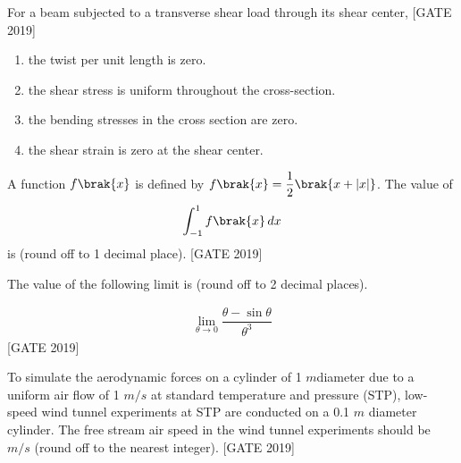     \item For a beam subjected to a transverse shear load through its shear center,
    \hfill{[GATE 2019]}
    
        \begin{enumerate}
            \item the twist per unit length is zero.
            \item the shear stress is uniform throughout the cross-section.
            \item the bending stresses in the cross section are zero.
            \item the shear strain is zero at the shear center.
        \end{enumerate}
    


  \item A function $f\brak{x}$ is defined by $f\brak{x} = \dfrac{1}{2}\brak{x + |x|}$. The value of \begin{align*}
      \int_{-1}^{1} f\brak{x} \, dx
  \end{align*} is \underline{\hspace{2cm} } (round off to 1 decimal place). \hfill{[GATE 2019]}

    \item The value of the following limit is \underline{\hspace{2cm}}(round off to 2 decimal places).
    
    \begin{align*}
    \lim_{\theta \to 0} \dfrac{\theta - \sin \theta}{\theta^3}
    \end{align*}
    \hfill{[GATE 2019]}
    
    \item To simulate the aerodynamic forces on a cylinder of 1 $m$diameter due to a uniform air flow of 1 $m/s$ at standard temperature and pressure (STP), low-speed wind tunnel experiments at STP are conducted on a 0.1 $m$ diameter cylinder. The free stream air speed in the wind tunnel experiments should be \underline{\hspace{2cm}} $m/s$ (round off to the nearest integer).
    \hfill{[GATE 2019]}

